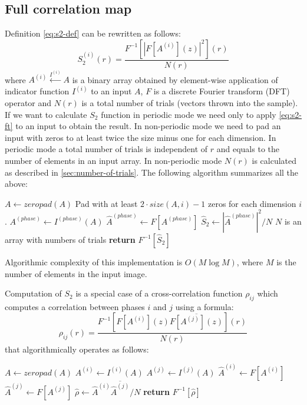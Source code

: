 \documentclass[1p]{elsarticle}
\begin{document}
\subsection{Full correlation map}
\label{sec:map}
Definition \cref{eq:s2-def} can be rewritten as follows:
\begin{equation}
  S_2^{(i)}(r) = \frac{F^{-1} [|F [A^{(i)}](z)|^2] (r)}{N(r)} \label{eq:s2-ft}
\end{equation}
where $A^{(i)} \xleftarrow{I^{(i)}} A$ is a binary array obtained by element-wise
application of indicator function $I^{(i)}$ to an input $A$, $F$ is a discrete
Fourier transform (DFT) operator and $N(r)$ is a total number of trials (vectors
thrown into the sample). If we want to calculate $S_2$ function in periodic mode
we need only to apply \cref{eq:s2-ft} to an input to obtain the result. In
non-periodic mode we need to pad an input with zeros to at least twice the size
minus one for each dimension. In periodic mode a total number of trials is
independent of $r$ and equals to the number of elements in an input array. In
non-periodic mode $N(r)$ is calculated as described in
\ref{sec:number-of-trials}. The following algorithm summarizes all the above:
\begin{algorithmic}[1]
  \State $A \gets zeropad(A)$
  \Comment Pad with at least $2\cdot size(A, i) - 1$ zeros for each dimension $i$.
  \EndIf
  \State $A^{(phase)} \gets I^{(phase)} (A)$
  \State $\hat{A}^{(phase)} \gets F[A^{(phase)}]$
  \State $\hat{S}_2 \gets |\hat{A}^{(phase)}|^2 / N$
  \Comment $N$ is an array with numbers of trials
  \State \textbf{return} $F^{-1} [\hat{S}_2]$
  \EndProcedure
\end{algorithmic}
Algorithmic complexity of this implementation is $O(M \log M)$, where $M$ is the
number of elements in the input image.

Computation of $S_2$ is a special case of a cross-correlation function $\rho_{ij}$
which computes a correlation between phases $i$ and $j$ using a formula:
\begin{equation}
  \rho_{ij}(r) = \frac{F^{-1} [F[A^{(i)}](z) \overline{F[A^{(j)}](z)}] (r)}{N(r)} \label{eq:cross-ft}
\end{equation}
that algorithmically operates as follows:
\begin{algorithmic}[1]
    \State $A \gets zeropad(A)$
  \EndIf
  \State $A^{(i)} \gets I^{(i)} (A)$
  \State $A^{(j)} \gets I^{(j)} (A)$
  \State $\hat{A}^{(i)} \gets F[A^{(i)}]$
  \State $\hat{A}^{(j)} \gets F[A^{(j)}]$
  \State $\hat{\rho} \gets \hat{A}^{(i)} \overline{\hat{A}^{(j)}} / N$
  \State \textbf{return} $F^{-1} [\hat{\rho}]$
  \EndProcedure
\end{algorithmic}
\end{document}
